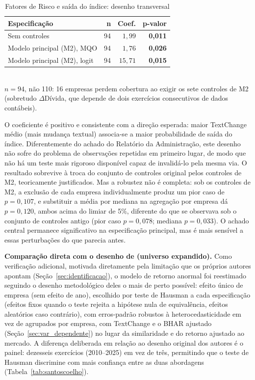 \documentclass[a4paper,12pt]{report}
\begin{document}
\begin{table}[htbp]
    \centering
    \caption{Fatores de Risco e saída do índice: desenho transversal}
    \label{tab:riskfactors}
    \begin{tabular}{@{}p{6.5cm}rrr@{}}
        \toprule
        \textbf{Especificação} & \textbf{n} & \textbf{Coef.} & \textbf{p-valor} \\
        \midrule
        Sem controles                              & 94 & $1{,}99$ & \textbf{0,011} \\
        Modelo principal (M2), MQO                  & 94 & $1{,}76$ & \textbf{0,026} \\
        Modelo principal (M2), logit                & 94 & $15{,}71$ & \textbf{0,015} \\
        \bottomrule
    \end{tabular}
    \\[0.3cm]
    {\footnotesize $n=94$, não 110: 16 empresas perdem cobertura ao exigir os sete controles de M2 (sobretudo $\Delta$Dívida, que depende de dois exercícios consecutivos de dados contábeis).}
\end{table}

O coeficiente é positivo e consistente com a direção esperada: maior TextChange médio (mais mudança textual) associa-se a maior probabilidade de saída do índice. Diferentemente do achado do Relatório da Administração, este desenho não sofre do problema de observações repetidas em primeiro lugar, de modo que não há um teste mais rigoroso disponível capaz de invalidá-lo pela mesma via. O resultado sobrevive à troca do conjunto de controles original pelos controles de M2, teoricamente justificados. Mas a robustez não é completa: sob os controles de M2, a exclusão de cada empresa individualmente produz um pior caso de $p=0{,}107$, e substituir a média por mediana na agregação por empresa dá $p=0{,}120$, ambos acima do limiar de 5\%, diferente do que se observava sob o conjunto de controles antigo (pior caso $p=0{,}078$; mediana $p=0{,}033$). O achado central permanece significativo na especificação principal, mas é mais sensível a essas perturbações do que parecia antes.

\textbf{Comparação direta com o desenho de  (universo expandido).} Como verificação adicional, motivada diretamente pela limitação que os próprios autores apontam (Seção~\ref{sec:identificacao}), o modelo de retorno anormal foi reestimado seguindo o desenho metodológico deles o mais de perto possível: efeito único de empresa (sem efeito de ano), escolhido por teste de Hausman a cada especificação (efeitos fixos quando o teste rejeita a hipótese nula de equivalência, efeitos aleatórios caso contrário), com erros-padrão robustos à heterocedasticidade em vez de agrupados por empresa, com TextChange e o BHAR ajustado (Seção~\ref{sec:var_dependente}) no lugar da similaridade e do retorno ajustado ao mercado. A diferença deliberada em relação ao desenho original dos autores é o painel: dezesseis exercícios (2010--2025) em vez de três, permitindo que o teste de Hausman discrimine com mais confiança entre as duas abordagens (Tabela~\ref{tab:santoscoelho}).
\end{document}

